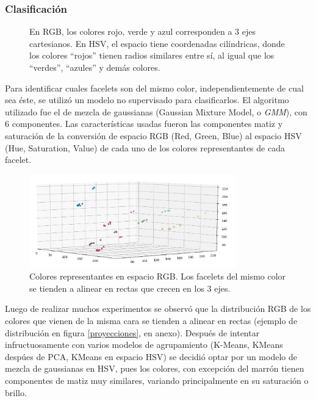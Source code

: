 \subsubsection{Clasificación}
\begin{figure}[h!]
	\centering
	\hfill
	\caption[Espacios de colores.]{En RGB, los colores rojo, verde y azul corresponden a 3 ejes cartesianos. En HSV, el espacio tiene coordenadas cilíndricas, donde los colores ``rojos'' tienen radios similares entre sí, al igual que los ``verdes'', ``azules'' y demás colores.}
	\label{colorspace}
\end{figure}
Para identificar cuales facelets son del mismo color, independientemente de cual sea éste, se utilizó un modelo no supervisado para clasificarlos. El algoritmo utilizado fue el de mezcla de gaussianas (Gaussian Mixture Model, o \textit{GMM})\cite{gmm}, con 6 componentes. Las características usadas fueron las componentes matiz y saturación de la conversión de espacio RGB (Red, Green, Blue)\cite{rgb} al espacio HSV (Hue, Saturation, Value)\cite{hsv} de cada uno de los colores representantes de cada facelet.

\begin{figure}[h!]
	\centering
	\includegraphics[width=0.8\textwidth]{figures/rgb_3d}
	\caption{Colores representantes en espacio RGB. Los facelets del mismo color se tienden a alinear en rectas que crecen en los 3 ejes.}
	\label{rgb3d}
\end{figure}


Luego de realizar muchos experimentos se observó que la distribución RGB de los colores que vienen de la misma cara se tienden a alinear en rectas (ejemplo de distribución en figura \ref{proyecciones}, en anexo). Después de intentar infructuosamente con varios modelos de agrupamiento (K-Means, KMeans despúes de PCA, KMeans en espacio HSV) se decidió optar por un modelo de mezcla de gaussianas en HSV, pues los colores, con excepción del marrón tienen componentes de matiz muy similares, variando principalmente en su saturación o brillo.

